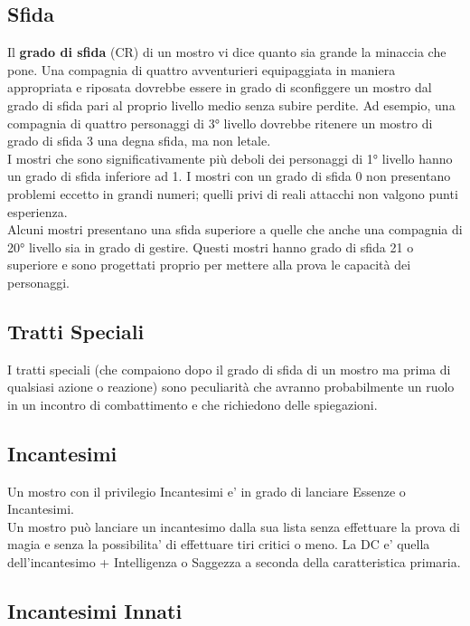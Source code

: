 \subsection{Sfida}

Il \textbf{grado di sfida} (CR) di un mostro vi dice quanto sia grande la minaccia che pone. Una compagnia di quattro avventurieri equipaggiata in maniera appropriata e riposata dovrebbe essere in grado di sconfiggere un mostro dal grado di sfida pari al proprio livello medio senza subire perdite. Ad esempio, una compagnia di quattro personaggi di 3° livello dovrebbe ritenere un mostro di grado di sfida 3 una degna sfida, ma non letale.\\
I mostri che sono significativamente più deboli dei personaggi di 1° livello hanno un grado di sfida inferiore ad 1. I mostri con un grado di sfida 0 non presentano problemi eccetto in grandi numeri; quelli privi di reali attacchi non valgono punti esperienza.\\
Alcuni mostri presentano una sfida superiore a quelle che anche una compagnia di 20° livello sia in grado di gestire. Questi mostri hanno grado di sfida 21 o superiore e sono progettati proprio per mettere alla prova le capacità dei personaggi.\\

\subsection{Tratti Speciali}

I tratti speciali (che compaiono dopo il grado di sfida di un mostro ma prima di qualsiasi azione o reazione) sono peculiarità che avranno probabilmente un ruolo in un incontro di combattimento e che richiedono delle spiegazioni.

\subsection{Incantesimi}

Un mostro con il privilegio Incantesimi e' in grado di lanciare Essenze o Incantesimi.\\
Un mostro può lanciare un incantesimo dalla sua lista senza effettuare la prova di magia e senza la possibilita' di effettuare tiri critici o meno. La DC e' quella dell'incantesimo + Intelligenza o Saggezza a seconda della caratteristica primaria.

\subsection{Incantesimi Innati}

